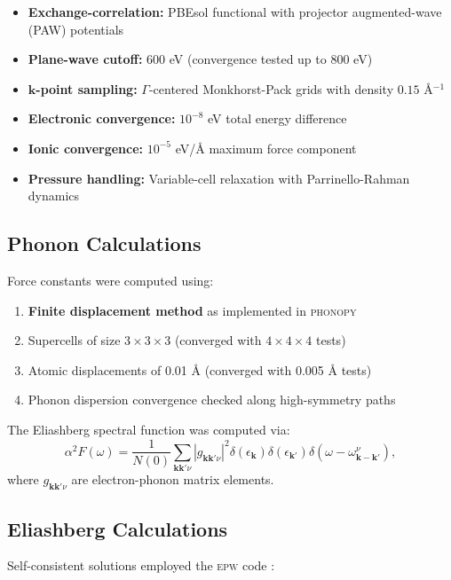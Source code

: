 \documentclass[11pt,a4paper]{article}
\theoremstyle{definition}
\begin{document}
\begin{itemize}
\item \textbf{Exchange-correlation:} PBEsol functional \cite{perdew2008} with projector augmented-wave (PAW) potentials
\item \textbf{Plane-wave cutoff:} 600 eV (convergence tested up to 800 eV)
\item \textbf{$\mathbf{k}$-point sampling:} $\Gamma$-centered Monkhorst-Pack grids with density $0.15$ Å$^{-1}$
\item \textbf{Electronic convergence:} $10^{-8}$ eV total energy difference
\item \textbf{Ionic convergence:} $10^{-5}$ eV/Å maximum force component
\item \textbf{Pressure handling:} Variable-cell relaxation with Parrinello-Rahman dynamics
\end{itemize}

\subsection{Phonon Calculations}

Force constants were computed using:
\begin{enumerate}
\item \textbf{Finite displacement method} as implemented in \textsc{phonopy} \cite{togo2015}
\item Supercells of size $3\times3\times3$ (converged with $4\times4\times4$ tests)
\item Atomic displacements of 0.01 Å (converged with 0.005 Å tests)
\item Phonon dispersion convergence checked along high-symmetry paths
\end{enumerate}

The Eliashberg spectral function was computed via:
\begin{equation}
\alpha^2F(\omega) = \frac{1}{N(0)}\sum_{\mathbf{k}\mathbf{k}'\nu} |g_{\mathbf{k}\mathbf{k}'\nu}|^2 \delta(\epsilon_{\mathbf{k}})\delta(\epsilon_{\mathbf{k}'})\delta(\omega - \omega_{\mathbf{k}-\mathbf{k}'}^\nu),
\end{equation}
where $g_{\mathbf{k}\mathbf{k}'\nu}$ are electron-phonon matrix elements.

\subsection{Eliashberg Calculations}

Self-consistent solutions employed the \textsc{epw} code \cite{ponce2016}:
\end{document}
